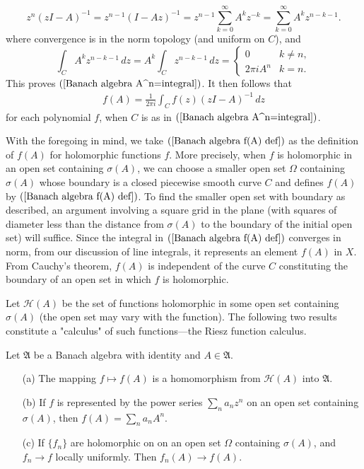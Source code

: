 \[z^n(zI-A)^{-1}=z^{n-1}(I-Az)^{-1}=z^{n-1}\sum_{k=0}^{\infty}A^kz^{-k}=\sum_{k=0}^{\infty}A^kz^{n-k-1}.\]
where convergence is in the norm topology (and uniform on $C$), and
\[\int_CA^kz^{n-k-1}\,dz=A^k\int_Cz^{n-k-1}\,dz=\begin{cases}
0&k\neq n,\\
2\pi iA^n&k=n.
\end{cases}\]
This proves $(\ref{Banach algebra A^n=integral})$. It then follows that
\begin{align}\label{Banach algebra f(A) def}
f(A)=\frac{1}{2\pi i}\int_C f(z)(zI-A)^{-1}\,dz
\end{align}
for each polynomial $f$, when $C$ is as in $(\ref{Banach algebra A^n=integral})$.\par
With the foregoing in mind, we take $(\ref{Banach algebra f(A) def})$ as the definition of $f(A)$ for holomorphic functions $f$. More precisely, when $f$ is holomorphic in an open set containing $\sigma(A)$, we can choose a smaller open set $\Omega$ containing $\sigma(A)$ whose boundary is a closed piecewise smooth curve $C$ and defines $f(A)$ by $(\ref{Banach algebra f(A) def})$. To find the smaller open set with boundary as described, an argument involving a square grid in the plane (with squares of diameter less than the distance from $\sigma(A)$ to the boundary of the initial open set) will suffice. Since the integral in $(\ref{Banach algebra f(A) def})$ converges in norm, from our discussion of line integrals, it represents an element $f(A)$ in $X$. From Cauchy's theorem, $f(A)$ is independent of the curve $C$ constituting the boundary of an open set in which $f$ is holomorphic.\par
Let $\mathcal{H}(A)$ be the set of functions holomorphic in some open set containing $\sigma(A)$ (the open set may vary with the function). The following two results constitute a "calculus" of such functions---the Riesz function calculus.
\begin{theorem}
Let $\mathfrak{A}$ be a Banach algebra with identity and $A\in\mathfrak{A}$.
\begin{itemize}
\item[(a)] The mapping $f\mapsto f(A)$ is a homomorphism from $\mathcal{H}(A)$ into $\mathfrak{A}$.
\item[(b)] If $f$ is represented by the power series $\sum_na_nz^n$ on an open set containing $\sigma(A)$, then $f(A)=\sum_na_nA^n$.
\item[(c)] If $\{f_n\}$ are holomorphic on on an open set $\Omega$ containing $\sigma(A)$, and $f_n\to f$ locally uniformly. Then $f_n(A)\to f(A)$.
\end{itemize}
\end{theorem}
